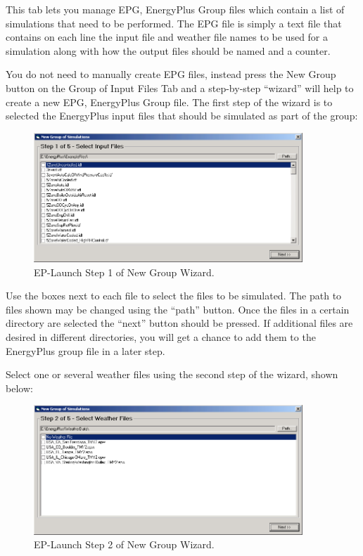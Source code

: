 This tab lets you manage EPG, EnergyPlus Group files which contain a list of simulations that need to be performed. The EPG file is simply a text file that contains on each line the input file and weather file names to be used for a simulation along with how the output files should be named and a counter.

You do not need to manually create EPG files, instead press the New Group button on the Group of Input Files Tab and a step-by-step ``wizard'' will help to create a new EPG, EnergyPlus Group file. The first step of the wizard is to selected the EnergyPlus input files that should be simulated as part of the group:

\begin{figure}[hbtp] %
\centering
\includegraphics[width=0.9\textwidth, height=0.9\textheight, keepaspectratio=true]{media/image108.png}
\caption{EP-Launch Step 1 of New Group Wizard. \protect \label{fig:ep-launch-step-1-of-new-group-wizard.}}
\end{figure}

Use the boxes next to each file to select the files to be simulated. The path to files shown may be changed using the ``path'' button. Once the files in a certain directory are selected the ``next'' button should be pressed. If additional files are desired in different directories, you will get a chance to add them to the EnergyPlus group file in a later step.

Select one or several weather files using the second step of the wizard, shown below:

\begin{figure}[hbtp] %
\centering
\includegraphics[width=0.9\textwidth, height=0.9\textheight, keepaspectratio=true]{media/image109.png}
\caption{EP-Launch Step 2 of New Group Wizard. \protect \label{fig:ep-launch-step-2-of-new-group-wizard.}}
\end{figure}

